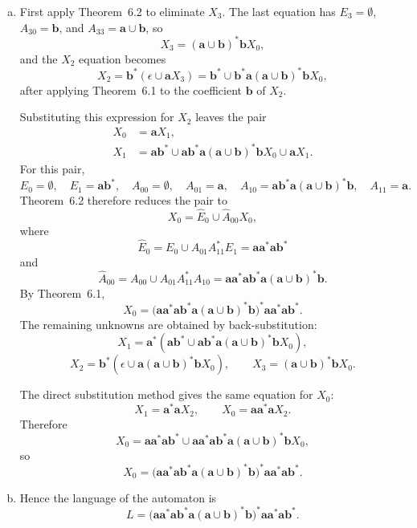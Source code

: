 \begin{enumerate}[{6.}1.]
\begin{enumerate}[(a)]
	  \item First apply Theorem~6.2 to eliminate $X_3$.  The last equation has
	  $E_3=\emptyset$, $A_{30}=\pmb{b}$, and
	  $A_{33}=\pmb{a}\cup\pmb{b}$, so
	  \[
	  X_3=(\pmb{a}\cup\pmb{b})^*\pmb{b}X_0,
	  \]
	  and the $X_2$ equation becomes
	  \[
	  X_2=\pmb{b}^*(\epsilon\cup\pmb{a}X_3)
	      =\pmb{b}^*\cup\pmb{b}^*\pmb{a}(\pmb{a}\cup\pmb{b})^*\pmb{b}X_0,
	  \]
	  after applying Theorem~6.1 to the coefficient $\pmb{b}$ of $X_2$.

	  Substituting this expression for $X_2$ leaves the pair
	  \begin{align*}
	    X_0 &= \pmb{a}X_1,\\
	    X_1 &= \pmb{a}\pmb{b}^*
	      \cup \pmb{a}\pmb{b}^*\pmb{a}(\pmb{a}\cup\pmb{b})^*\pmb{b}X_0
	      \cup \pmb{a}X_1 .
	  \end{align*}
	  For this pair,
	  \[
	  E_0=\emptyset,\quad
	  E_1=\pmb{a}\pmb{b}^*,\quad
	  A_{00}=\emptyset,\quad A_{01}=\pmb{a},\quad
	  A_{10}=\pmb{a}\pmb{b}^*\pmb{a}(\pmb{a}\cup\pmb{b})^*\pmb{b},\quad
	  A_{11}=\pmb{a}.
	  \]
	  Theorem~6.2 therefore reduces the pair to
	  \[
	  X_0=\hat{E}_0\cup\hat{A}_{00}X_0,
	  \]
	  where
	  \[
	  \hat{E}_0
	  =E_0\cup A_{01}A_{11}^*E_1
	  =\pmb{a}\pmb{a}^*\pmb{a}\pmb{b}^*
	  \]
	  and
	  \[
	  \hat{A}_{00}
	  =A_{00}\cup A_{01}A_{11}^*A_{10}
	  =\pmb{a}\pmb{a}^*\pmb{a}\pmb{b}^*\pmb{a}(\pmb{a}\cup\pmb{b})^*\pmb{b}.
	  \]
	  By Theorem~6.1,
	  \[
	  X_0=
	  \bigl(\pmb{a}\pmb{a}^*\pmb{a}\pmb{b}^*\pmb{a}(\pmb{a}\cup\pmb{b})^*\pmb{b}\bigr)^*
	  \pmb{a}\pmb{a}^*\pmb{a}\pmb{b}^*.
	  \]
	  The remaining unknowns are obtained by back-substitution:
	  \[
	  X_1=\pmb{a}^*(\pmb{a}\pmb{b}^*
	      \cup \pmb{a}\pmb{b}^*\pmb{a}(\pmb{a}\cup\pmb{b})^*\pmb{b}X_0),
	  \]
	  \[
	  X_2=\pmb{b}^*(\epsilon\cup\pmb{a}(\pmb{a}\cup\pmb{b})^*\pmb{b}X_0),
	  \qquad
	  X_3=(\pmb{a}\cup\pmb{b})^*\pmb{b}X_0.
	  \]

	  The direct substitution method gives the same equation for $X_0$:
	  \[
	  X_1=\pmb{a}^*\pmb{a}X_2,
	  \qquad
  X_0=\pmb{a}\pmb{a}^*\pmb{a}X_2.
  \]
  Therefore
  \[
  X_0=\pmb{a}\pmb{a}^*\pmb{a}\pmb{b}^*
     \cup \pmb{a}\pmb{a}^*\pmb{a}\pmb{b}^*\pmb{a}(\pmb{a}\cup\pmb{b})^*\pmb{b}X_0,
  \]
  so
  \[
  X_0=
  \bigl(\pmb{a}\pmb{a}^*\pmb{a}\pmb{b}^*\pmb{a}(\pmb{a}\cup\pmb{b})^*\pmb{b}\bigr)^*
  \pmb{a}\pmb{a}^*\pmb{a}\pmb{b}^*.
  \]

  \item Hence the language of the automaton is
  \[
  L=
  \bigl(\pmb{a}\pmb{a}^*\pmb{a}\pmb{b}^*\pmb{a}(\pmb{a}\cup\pmb{b})^*\pmb{b}\bigr)^*
  \pmb{a}\pmb{a}^*\pmb{a}\pmb{b}^*.
  \]


\end{enumerate}
\end{enumerate}
